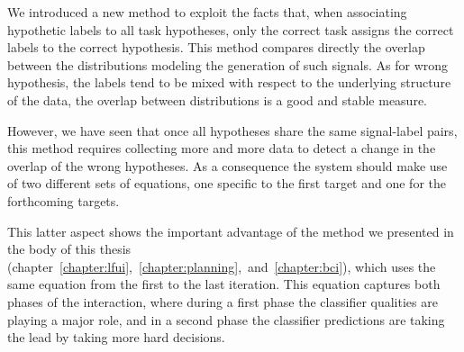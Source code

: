 We introduced a new method to exploit the facts that, when associating hypothetic labels to all task hypotheses, only the correct task assigns the correct labels to the correct hypothesis. This method compares directly the overlap between the distributions modeling the generation of such signals. As for wrong hypothesis, the labels tend to be mixed with respect to the underlying structure of the data, the overlap between distributions is a good and stable measure. 

However, we have seen that once all hypotheses share the same signal-label pairs, this method requires collecting more and more data to detect a change in the overlap of the wrong hypotheses. As a consequence the system should make use of two different sets of equations, one specific to the first target and one for the forthcoming targets.

This latter aspect shows the important advantage of the method we presented in the body of this thesis (chapter~\ref{chapter:lfui},~\ref{chapter:planning},~and~\ref{chapter:bci}), which uses the same equation from the first to the last iteration. This equation captures both phases of the interaction, where during a first phase the classifier qualities are playing a major role, and in a second phase the classifier predictions are taking the lead by taking more hard decisions.
